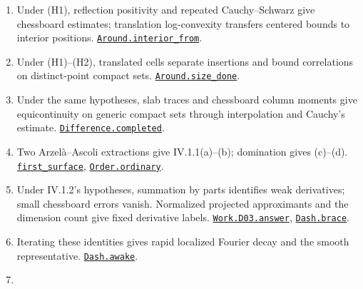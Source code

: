\documentclass[
  letterpaper,
  11pt]{article}
\providecommand{\tightlist}{%
  \setlength{\itemsep}{0pt}\setlength{\parskip}{0pt}}
\begin{document}
\begin{enumerate}
\def\labelenumi{\arabic{enumi}.}
\tightlist
\item
  Under (H1), reflection positivity and repeated Cauchy--Schwarz give
  chessboard estimates; translation log-convexity transfers centered
  bounds to interior positions.
  \href{https://github.com/yang-mills-group/OpenAI-YM-20261028/blob/3456e5e75cf8d4cd558955a5c7638fba2d68f464/YM/Extraction/Around.lean\#L95-L129}{\texttt{Around.interior\_from}}.
\item
  Under (H1)--(H2), translated cells separate insertions and bound
  correlations on distinct-point compact sets.
  \href{https://github.com/yang-mills-group/OpenAI-YM-20261028/blob/3456e5e75cf8d4cd558955a5c7638fba2d68f464/YM/Extraction/Held.lean\#L120-L132}{\texttt{Around.size\_done}}.
\item
  Under the same hypotheses, slab traces and chessboard column moments
  give equicontinuity on generic compact sets through interpolation and
  Cauchy's estimate.
  \href{https://github.com/yang-mills-group/OpenAI-YM-20261028/blob/3456e5e75cf8d4cd558955a5c7638fba2d68f464/YM/Extraction/Equicontinuity.lean\#L181-L214}{\texttt{Difference.completed}}.
\item
  Two Arzelà--Ascoli extractions give IV.1.1(a)--(b); domination gives
  (c)--(d).
  \href{https://github.com/yang-mills-group/OpenAI-YM-20261028/blob/3456e5e75cf8d4cd558955a5c7638fba2d68f464/YM/Extraction/Lipschitz.lean\#L166-L184}{\texttt{first\_surface}},
  \href{https://github.com/yang-mills-group/OpenAI-YM-20261028/blob/3456e5e75cf8d4cd558955a5c7638fba2d68f464/YM/Extraction/Integrate.lean\#L115-L153}{\texttt{Order.ordinary}}.
\item
  Under IV.1.2's hypotheses, summation by parts identifies weak
  derivatives; small chessboard errors vanish. Normalized projected
  approximants and the dimension count give fixed derivative labels.
  \href{https://github.com/yang-mills-group/OpenAI-YM-20261028/blob/3456e5e75cf8d4cd558955a5c7638fba2d68f464/YM/Work/D03.lean\#L244-L249}{\texttt{Work.D03.answer}},
  \href{https://github.com/yang-mills-group/OpenAI-YM-20261028/blob/3456e5e75cf8d4cd558955a5c7638fba2d68f464/YM/Dash/Limits.lean\#L69-L111}{\texttt{Dash.brace}}.
\item
  Iterating these identities gives rapid localized Fourier decay and the
  smooth representative.
  \href{https://github.com/yang-mills-group/OpenAI-YM-20261028/blob/3456e5e75cf8d4cd558955a5c7638fba2d68f464/YM/Dash/Slew.lean\#L26-L58}{\texttt{Dash.awake}}.
\item

\end{enumerate}
\end{document}
